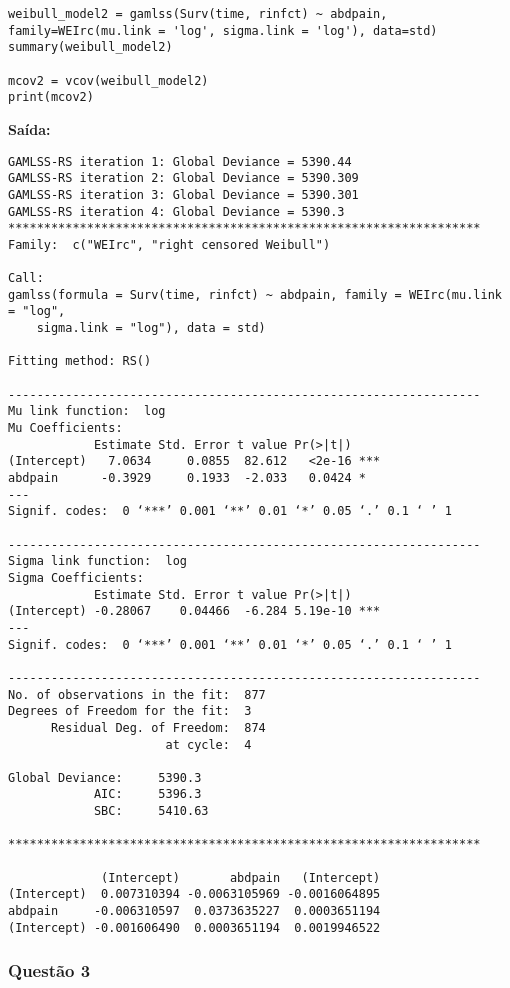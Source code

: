 \documentclass[a4paper,12pt]{article}
\begin{document}
\begin{lstlisting}
weibull_model2 = gamlss(Surv(time, rinfct) ~ abdpain, family=WEIrc(mu.link = 'log', sigma.link = 'log'), data=std)
summary(weibull_model2)

mcov2 = vcov(weibull_model2)
print(mcov2)
\end{lstlisting}

\textbf{Saída:}
\begin{verbatim}
GAMLSS-RS iteration 1: Global Deviance = 5390.44 
GAMLSS-RS iteration 2: Global Deviance = 5390.309 
GAMLSS-RS iteration 3: Global Deviance = 5390.301 
GAMLSS-RS iteration 4: Global Deviance = 5390.3 
******************************************************************
Family:  c("WEIrc", "right censored Weibull") 

Call:  
gamlss(formula = Surv(time, rinfct) ~ abdpain, family = WEIrc(mu.link = "log",  
    sigma.link = "log"), data = std) 

Fitting method: RS() 

------------------------------------------------------------------
Mu link function:  log
Mu Coefficients:
            Estimate Std. Error t value Pr(>|t|)    
(Intercept)   7.0634     0.0855  82.612   <2e-16 ***
abdpain      -0.3929     0.1933  -2.033   0.0424 *  
---
Signif. codes:  0 ‘***’ 0.001 ‘**’ 0.01 ‘*’ 0.05 ‘.’ 0.1 ‘ ’ 1

------------------------------------------------------------------
Sigma link function:  log
Sigma Coefficients:
            Estimate Std. Error t value Pr(>|t|)    
(Intercept) -0.28067    0.04466  -6.284 5.19e-10 ***
---
Signif. codes:  0 ‘***’ 0.001 ‘**’ 0.01 ‘*’ 0.05 ‘.’ 0.1 ‘ ’ 1

------------------------------------------------------------------
No. of observations in the fit:  877 
Degrees of Freedom for the fit:  3
      Residual Deg. of Freedom:  874 
                      at cycle:  4 
 
Global Deviance:     5390.3 
            AIC:     5396.3 
            SBC:     5410.63 

******************************************************************

             (Intercept)       abdpain   (Intercept)
(Intercept)  0.007310394 -0.0063105969 -0.0016064895
abdpain     -0.006310597  0.0373635227  0.0003651194
(Intercept) -0.001606490  0.0003651194  0.0019946522

\end{verbatim}


\subsubsection{Questão 3}
\end{document}
